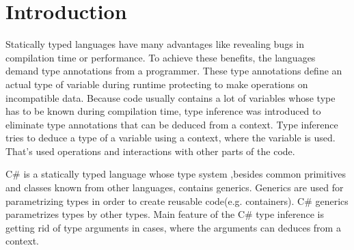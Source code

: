\chapter*{Introduction}

Statically typed languages have many advantages like revealing bugs in compilation time or performance.
To achieve these benefits, the languages demand type annotations from a programmer.
These type annotations define an actual type of variable during runtime protecting to make operations on incompatible data.
Because code usually contains a lot of variables whose type has to be known during compilation time, type inference was introduced to eliminate type annotations that can be deduced from a context.
Type inference tries to deduce a type of a variable using a context, where the variable is used.
That's used operations and interactions with other parts of the code.


C\# is a statically typed language whose type system ,besides common primitives and classes known from other languages, contains generics.
Generics are used for parametrizing types in order to create reusable code(e.g. containers).
C\# generics parametrizes types by other types.
Main feature of the C\# type inference is getting rid of type arguments in cases, where the arguments can deduces from a context.

